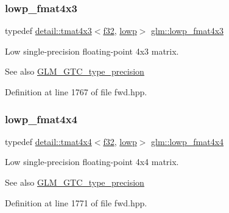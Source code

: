 \subsubsection{\texorpdfstring{lowp\+\_\+fmat4x3}{lowp\_fmat4x3}}
{\footnotesize\ttfamily typedef \hyperlink{structglm_1_1detail_1_1tmat4x3}{detail\+::tmat4x3}$<$\hyperlink{group__gtc__type__precision_ga0ec999b57f5330d9021256e96038df04}{f32}, \hyperlink{namespaceglm_a0f04f086094c747d227af4425893f545ae161af3fc695e696ce3bf69f7332bc2d}{lowp}$>$ \hyperlink{group__gtc__type__precision_gaa4df4f3adcc8eb3bed680b14a87fb2c4}{glm\+::lowp\+\_\+fmat4x3}}

Low single-\/precision floating-\/point 4x3 matrix. \begin{DoxySeeAlso}{See also}
\hyperlink{group__gtc__type__precision}{G\+L\+M\+\_\+\+G\+T\+C\+\_\+type\+\_\+precision} 
\end{DoxySeeAlso}


Definition at line 1767 of file fwd.\+hpp.

\mbox{\label{group__gtc__type__precision_ga9ff955b170643f547661d2e7263ee426}} 
\subsubsection{\texorpdfstring{lowp\+\_\+fmat4x4}{lowp\_fmat4x4}}
{\footnotesize\ttfamily typedef \hyperlink{structglm_1_1detail_1_1tmat4x4}{detail\+::tmat4x4}$<$\hyperlink{group__gtc__type__precision_ga0ec999b57f5330d9021256e96038df04}{f32}, \hyperlink{namespaceglm_a0f04f086094c747d227af4425893f545ae161af3fc695e696ce3bf69f7332bc2d}{lowp}$>$ \hyperlink{group__gtc__type__precision_ga9ff955b170643f547661d2e7263ee426}{glm\+::lowp\+\_\+fmat4x4}}

Low single-\/precision floating-\/point 4x4 matrix. \begin{DoxySeeAlso}{See also}
\hyperlink{group__gtc__type__precision}{G\+L\+M\+\_\+\+G\+T\+C\+\_\+type\+\_\+precision} 
\end{DoxySeeAlso}


Definition at line 1771 of file fwd.\+hpp.

\mbox{\label{group__gtc__type__precision_gad5266f0507395cf8cdfe84b9cf5496e4}} 
